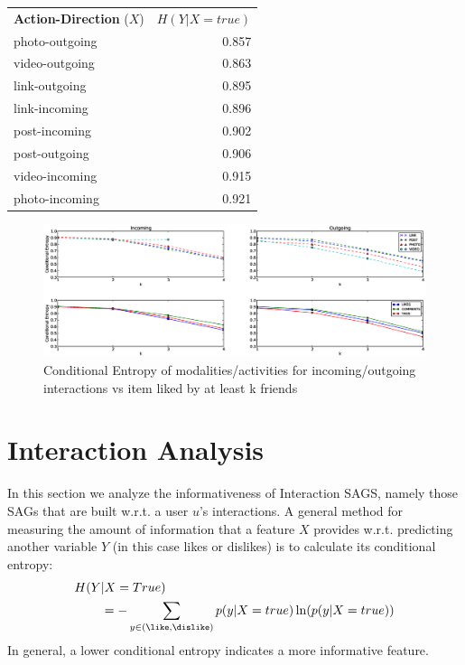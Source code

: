 \begin{table}
{\begin{tabular}{| >{\small}l | >{\small}r | }
		\hline
\multicolumn{2}{c}{}\\
                \hline	
		\textbf{Action-Direction} ($X$) & $H(Y|X=true)$ \\
		\hline
		photo-outgoing & 0.857 \\
		video-outgoing & 0.863 \\
		link-outgoing & 0.895 \\
		link-incoming & 0.896 \\
		post-incoming & 0.902 \\
		post-outgoing & 0.906 \\
		video-incoming & 0.915 \\
		photo-incoming & 0.921 \\
		\hline
				
	\end{tabular}}
\end{table}

\begin{figure}[tbp!]
\hspace{-15mm}\includegraphics[width=210mm]{data/plots/vsk/ModalityActionsvsKFriends.eps}
\caption{Conditional Entropy  of modalities/activities for incoming/outgoing interactions vs item liked by at least k friends}
\label{Fig2}
\end{figure}

\section{Interaction Analysis}

In this section we analyze the informativeness of Interaction SAGS,
namely those SAGs that are built w.r.t. a user $u$'s interactions.
A general method for measuring the amount of information that a 
feature $X$ provides w.r.t. predicting another variable $Y$ (in this
case likes or dislikes) is to calculate its conditional entropy:
\begin{align*}
H(Y&|X=True)\\
& = -\sum_{y\in{(\like,\dislike)}} p(y|X=true) \ln( p(y|X=true))
\end{align*}
In general, a lower conditional entropy indicates a more informative
feature.

